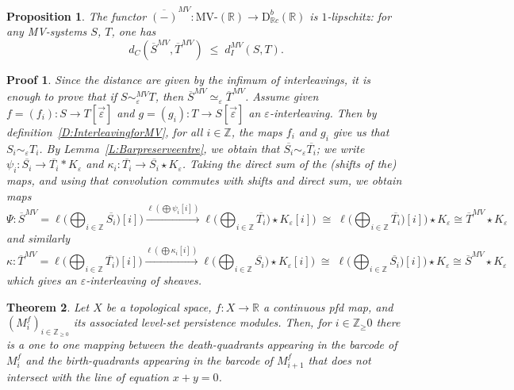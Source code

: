 \documentclass[a4paper, english, 11pt]{article}
\newcommand{\0}{\vec{0}}
\newcommand{\R}[0]{\mathbb{R}}
\newcommand{\Z}[0]{\mathbb{Z}}
\newcommand{\D}[0]{\text{D}}
\newtheorem{prop}{Proposition}[section]
\newtheorem*{pf}{Proof} }
\newtheorem{thm}[prop]{Theorem}
\begin{document}
\begin{prop}\label{P:BarMViso}
The functor $\overline{(-)}^{MV}: \text{MV-}(\R) \to \D^b_{\R c}(\R)$ is $1$-lipschitz: for any MV-systems $S$, $T$, one has
$$d_C(\overline{S}^{MV},\overline{T}^{MV}) \; \leq \; d_I^{MV}( S, T).$$
\end{prop}
\begin{pf}
Since the distance are given by the infimum of interleavings, it is enough to prove that if $S \sim_{\varepsilon}^{MV} T$, then $\overline{S}^{MV} \simeq_{\varepsilon} \overline{T}^{MV}$. 
Assume given $f=(f_i): S\to T[\vec{\varepsilon}] $ and $g=(g_i): T\to S[\vec{\varepsilon}]$ an $\varepsilon$-interleaving.
Then by definition~\ref{D:InterleavingforMV}, for all $i\in \Z$, the maps $f_i$ and $g_i$  give us that    $S_i \sim_{\varepsilon} T_i$. By Lemma~\ref{L:Barpreserveentre}, we obtain that 
$\overline{S_i} \sim_{\varepsilon} \overline{T_i}$; we write $\psi_i: \overline{S_i}\to \overline{T_i}*K_\varepsilon$ and $\kappa_i: \overline{T_i} \to \overline{S_i} \star K_\varepsilon$. Taking the direct sum of the (shifts of the) maps, and using that convolution commutes with shifts and direct sum,  we obtain maps
$$ \Psi: \overline{S}^{MV} =  \ell\Big(\bigoplus_{i\in \Z} \overline{S_i})[i]\Big)\stackrel{\ell(\bigoplus \psi_i [i])}\longrightarrow \ell\Big(\bigoplus_{i\in \Z} \overline{T_i})\star K_\varepsilon[i]\Big) 
\; \cong \; \ell\Big(\bigoplus_{i\in \Z} \overline{T_i})[i]\Big) \star K_\varepsilon 
\cong \overline{T}^{MV}\star K_\varepsilon$$ and similarly
$$\kappa: \overline{T}^{MV} =  \ell\Big(\bigoplus_{i\in \Z} \overline{T_i})[i]\Big)\stackrel{\ell(\bigoplus \kappa_i [i])}\longrightarrow \ell\Big(\bigoplus_{i\in \Z} \overline{S_i})\star K_\varepsilon[i]\Big) 
\; \cong \; \ell\Big(\bigoplus_{i\in \Z} \overline{S_i})[i]\Big) \star K_\varepsilon 
\cong \overline{S}^{MV}\star K_\varepsilon$$ which gives an $\varepsilon$-interleaving of sheaves.
\end{pf}

\begin{thm}
Let $X$ be a topological space, $f: X \to \R$ a continuous pfd map, and $(M_i^f)_{i\in \Z_{\geq 0}}$ its associated level-set persistence modules. Then, for $i\in\Z_\geq 0$ there is a one to one mapping between the death-quadrants appearing in the barcode of $M_i^f$ and the birth-quadrants appearing in the barcode of $M_{i+1}^f$ that does not intersect with the line of equation $x + y = 0$. 
\end{thm}
\end{document}
